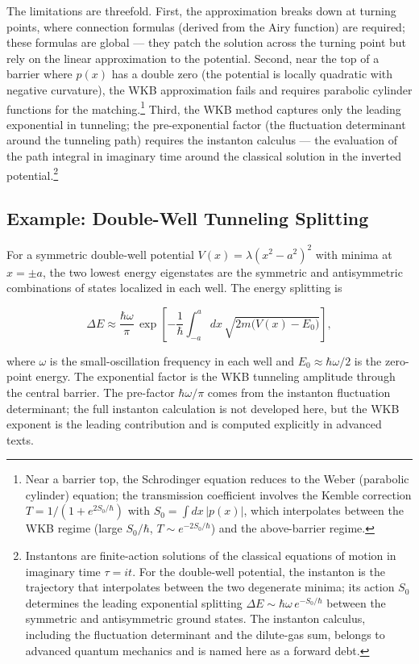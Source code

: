 The limitations are threefold. First, the approximation breaks down at turning points, where connection formulas (derived from the Airy function) are required; these formulas are global --- they patch the solution across the turning point but rely on the linear approximation to the potential. Second, near the top of a barrier where $p(x)$ has a double zero (the potential is locally quadratic with negative curvature), the WKB approximation fails and requires parabolic cylinder functions for the matching.\footnote{Near a barrier top, the Schrodinger equation reduces to the Weber (parabolic cylinder) equation; the transmission coefficient involves the Kemble correction $T = 1/(1+e^{2S_0/\hbar})$ with $S_0 = \int dx\,|p(x)|$, which interpolates between the WKB regime (large $S_0/\hbar$, $T \sim e^{-2S_0/\hbar}$) and the above-barrier regime.} Third, the WKB method captures only the leading exponential in tunneling; the pre-exponential factor (the fluctuation determinant around the tunneling path) requires the instanton calculus --- the evaluation of the path integral in imaginary time around the classical solution in the inverted potential.\footnote{Instantons are finite-action solutions of the classical equations of motion in imaginary time $\tau = it$. For the double-well potential, the instanton is the trajectory that interpolates between the two degenerate minima; its action $S_0$ determines the leading exponential splitting $\Delta E \sim \hbar\omega\,e^{-S_0/\hbar}$ between the symmetric and antisymmetric ground states. The instanton calculus, including the fluctuation determinant and the dilute-gas sum, belongs to advanced quantum mechanics and is named here as a forward debt.}

\subsection{Example: Double-Well Tunneling Splitting}

For a symmetric double-well potential $V(x) = \lambda(x^2 - a^2)^2$ with minima at $x = \pm a$, the two lowest energy eigenstates are the symmetric and antisymmetric combinations of states localized in each well. The energy splitting is
\begin{linenomath}
\begin{equation}
\Delta E \approx \frac{\hbar\omega}{\pi}\,\exp\left[-\frac{1}{\hbar}\int_{-a}^{a} dx\,\sqrt{2m\bigl(V(x)-E_0\bigr)}\right],
\end{equation}
\end{linenomath}
where $\omega$ is the small-oscillation frequency in each well and $E_0 \approx \hbar\omega/2$ is the zero-point energy. The exponential factor is the WKB tunneling amplitude through the central barrier. The pre-factor $\hbar\omega/\pi$ comes from the instanton fluctuation determinant; the full instanton calculation is not developed here, but the WKB exponent is the leading contribution and is computed explicitly in advanced texts.

